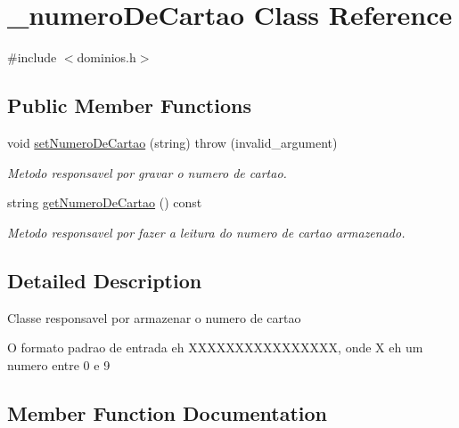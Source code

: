 \hypertarget{class__numero_de_cartao}{}\section{\+\_\+numero\+De\+Cartao Class Reference}
\label{class__numero_de_cartao}


{\ttfamily \#include $<$dominios.\+h$>$}

\subsection*{Public Member Functions}
\begin{DoxyCompactItemize}
\item 
void \mbox{\hyperlink{class__numero_de_cartao_adc6b5522ac0cc47ba4985519d8d9c90a}{set\+Numero\+De\+Cartao}} (string)  throw (invalid\+\_\+argument)
\begin{DoxyCompactList}\small\item\em Metodo responsavel por gravar o numero de cartao. \end{DoxyCompactList}\item 
string \mbox{\hyperlink{class__numero_de_cartao_a342accd11d21f97da2d97f57985e093e}{get\+Numero\+De\+Cartao}} () const
\begin{DoxyCompactList}\small\item\em Metodo responsavel por fazer a leitura do numero de cartao armazenado. \end{DoxyCompactList}\end{DoxyCompactItemize}


\subsection{Detailed Description}
Classe responsavel por armazenar o numero de cartao

O formato padrao de entrada eh X\+X\+X\+X\+X\+X\+X\+X\+X\+X\+X\+X\+X\+X\+XX, onde X eh um numero entre 0 e 9 

\subsection{Member Function Documentation}
\mbox{\label{class__numero_de_cartao_a342accd11d21f97da2d97f57985e093e}} 
